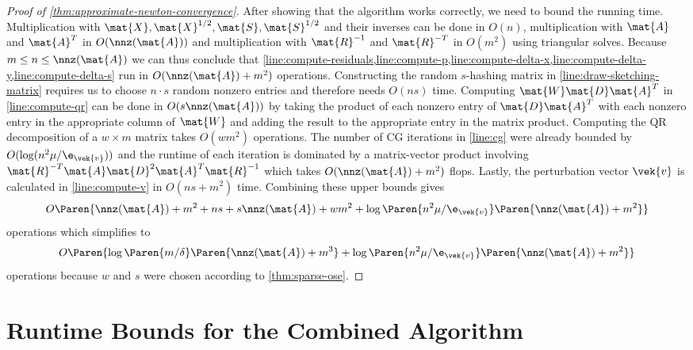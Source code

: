 \begin{proof}[Proof of \cref{thm:approximate-newton-convergence}]
  After showing that the algorithm works correctly, we need to bound the running time.
  Multiplication with \(\mat{X}, \mat{X}^{1/2}, \mat{S}, \mat{S}^{1/2}\) and their inverses can be done in \(O(n)\), multiplication with \(\mat{A}\) and \(\mat{A}^T\) in \(O(\nnz(\mat{A}))\) and multiplication with \(\mat{R}^{-1}\) and \(\mat{R}^{-T}\) in \(O(m^2)\) using triangular solves.
  Because \(m \leq n \leq \nnz(\mat{A})\) we can thus conclude that \cref{line:compute-residuals,line:compute-p,line:compute-delta-x,line:compute-delta-y,line:compute-delta-s} run in \(O(\nnz(\mat{A}) + m^2)\) operations.
  Constructing the random \(s\)-hashing matrix in \cref{line:draw-sketching-matrix} requires us to choose \(n \cdot s\) random nonzero entries and therefore needs \(O(n s)\) time.
  Computing \(\mat{W}\mat{D}\mat{A}^T\) in \cref{line:compute-qr} can be done in \(O(s \nnz(\mat{A}))\) by taking the product of each nonzero entry of \(\mat{D}\mat{A}^T\) with each nonzero entry in the appropriate column of \(\mat{W}\) and adding the result to the appropriate entry in the matrix product.
  Computing the QR decomposition of a \(w \times m\) matrix takes \(O(w m^2)\) operations.
  The number of CG iterations in \cref{line:cg} were already bounded by \(O(\log(n^2 \mu / \e_{\vek{v}}))\) and the runtime of each iteration is dominated by a matrix-vector product involving \(\mat{R}^{-T}\mat{A}\mat{D}^2\mat{A}^T\mat{R}^{-1}\) which takes \(O(\nnz(\mat{A}) + m^2)\) flops.
  Lastly, the perturbation vector \(\vek{v}\) is calculated in \cref{line:compute-v} in \(O(ns + m^2)\) time.
  Combining these upper bounds gives
  \[ O \Paren{\nnz(\mat{A}) + m^2 + ns + s \nnz(\mat{A}) + wm^2 + \log \Paren{n^2 \mu / \e_{\vek{v}}} \Paren{\nnz(\mat{A}) + m^2}} \]
  operations which simplifies to
  \[ O \Paren{\log \Paren{m/\delta} \Paren{\nnz(\mat{A}) + m^3} + \log \Paren{n^2 \mu / \e_{\vek{v}}} \Paren{\nnz(\mat{A}) + m^2}} \]
  operations because \(w\) and \(s\) were chosen according to \cref{thm:sparse-ose}.
\end{proof}


\section{Runtime Bounds for the Combined Algorithm}

